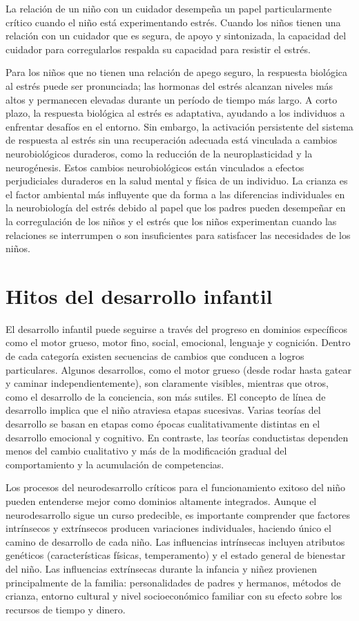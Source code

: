 \documentclass[11pt,letterpaper]{report}
\begin{document}
La relación de un niño con un cuidador desempeña un papel particularmente
crítico cuando el niño está experimentando estrés. Cuando los niños tienen una
relación con un cuidador que es segura, de apoyo y sintonizada, la capacidad
del cuidador para corregularlos respalda su capacidad para resistir el estrés.
\cite{Feldman3}

Para los niños que no tienen una relación de apego seguro, la respuesta
biológica al estrés puede ser pronunciada; las hormonas del estrés alcanzan
niveles más altos y permanecen elevadas durante un período de tiempo más largo.
A corto plazo, la respuesta biológica al estrés es adaptativa, ayudando a los
individuos a enfrentar desafíos en el entorno. Sin embargo, la activación
persistente del sistema de respuesta al estrés sin una recuperación adecuada
está vinculada a cambios neurobiológicos duraderos, como la reducción de la
neuroplasticidad y la neurogénesis. Estos cambios neurobiológicos están
vinculados a efectos perjudiciales duraderos en la salud mental y física de un
individuo. La crianza es el factor ambiental más influyente que da forma a las
diferencias individuales en la neurobiología del estrés debido al papel que los
padres pueden desempeñar en la corregulación de los niños y el estrés que los
niños experimentan cuando las relaciones se interrumpen o son insuficientes
para satisfacer las necesidades de los niños. \cite{Feldman3}

\section{Hitos del desarrollo infantil}
El desarrollo infantil puede seguirse a través del progreso en dominios
específicos como el motor grueso, motor fino, social, emocional, lenguaje y
cognición. Dentro de cada categoría existen secuencias de cambios que conducen
a logros particulares. Algunos desarrollos, como el motor grueso (desde rodar
hasta gatear y caminar independientemente), son claramente visibles, mientras
que otros, como el desarrollo de la conciencia, son más sutiles. El concepto de
línea de desarrollo implica que el niño atraviesa etapas sucesivas. Varias
teorías del desarrollo se basan en etapas como épocas cualitativamente
distintas en el desarrollo emocional y cognitivo. En contraste, las teorías
conductistas dependen menos del cambio cualitativo y más de la modificación
gradual del comportamiento y la acumulación de competencias.
\cite{Nelson19}

Los procesos del neurodesarrollo críticos para el funcionamiento exitoso del
niño pueden entenderse mejor como dominios altamente integrados. Aunque el
neurodesarrollo sigue un curso predecible, es importante comprender que
factores intrínsecos y extrínsecos producen variaciones individuales, haciendo
único el camino de desarrollo de cada niño. Las influencias intrínsecas
incluyen atributos genéticos (características físicas, temperamento) y el
estado general de bienestar del niño. Las influencias extrínsecas durante la
infancia y niñez provienen principalmente de la familia: personalidades de
padres y hermanos, métodos de crianza, entorno cultural y nivel
socioeconómico familiar con su efecto sobre los recursos de tiempo y dinero.
\cite{Gerber2010}
\end{document}
